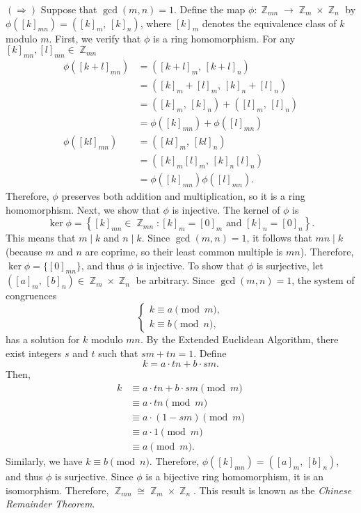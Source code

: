 \documentclass{article}
\DeclareMathOperator{\Z}{\mathbb{Z}}
\begin{document}
\((\Rightarrow)\) Suppose that $\gcd(m, n) = 1$. Define the map $\phi: \Z_{mn} \to \Z_m \times \Z_n$ by \(\phi([k]_{mn}) = \left([k]_m,\, [k]_n\right)\), where $[k]_m$ denotes the equivalence class of $k$ modulo $m$. First, we verify that $\phi$ is a ring homomorphism. For any $[k]_{mn}, [l]_{mn} \in \Z_{mn}$
\begin{align*}
\phi([k + l]_{mn}) &= \left([k + l]_m,\, [k + l]_n\right) \\
&= \left([k]_m + [l]_m,\, [k]_n + [l]_n\right) \\
&= \left([k]_m,\, [k]_n\right) + \left([l]_m,\, [l]_n\right) \\
&= \phi([k]_{mn}) + \phi([l]_{mn}) \\
\phi([kl]_{mn}) &= \left([kl]_m,\, [kl]_n\right) \\
&= \left([k]_m[l]_m,\, [k]_n[l]_n\right) \\
&= \phi([k]_{mn})\phi([l]_{mn}).
\end{align*}
Therefore, $\phi$ preserves both addition and multiplication, so it is a ring homomorphism. Next, we show that $\phi$ is injective. The kernel of $\phi$ is
\[\ker \phi = \left\{ [k]_{mn} \in \Z_{mn}: [k]_m = [0]_m \text{ and } [k]_n = [0]_n \right\}.\]
This means that $m \mid k$ and $n \mid k$. Since $\gcd(m, n) = 1$, it follows that $mn \mid k$ (because $m$ and $n$ are coprime, so their least common multiple is $mn$). Therefore, $\ker \phi = \{ [0]_{mn} \}$, and thus $\phi$ is injective. To show that $\phi$ is surjective, let $\left([a]_m,\, [b]_n\right) \in \Z_m \times \Z_n$ be arbitrary. Since $\gcd(m, n) = 1$, the system of congruences
\[
\begin{cases}
k \equiv a \pmod{m}, \\
k \equiv b \pmod{n},
\end{cases}
\]
has a solution for $k$ modulo $mn$. By the Extended Euclidean Algorithm, there exist integers $s$ and $t$ such that $s m + t n = 1$. Define
\[
k = a \cdot t n + b \cdot s m.
\]
Then,
\begin{align*}
k &\equiv a \cdot t n + b \cdot s m \pmod{m} \\
&\equiv a \cdot t n \pmod{m} \\
&\equiv a \cdot (1 - s m) \pmod{m} \\
&\equiv a \cdot 1 \pmod{m} \\
&\equiv a \pmod{m}.
\end{align*}
Similarly, we have $k \equiv b \pmod{n}$. Therefore, $\phi([k]_{mn}) = \left([a]_m,\, [b]_n\right)$, and thus $\phi$ is surjective. Since $\phi$ is a bijective ring homomorphism, it is an isomorphism. Therefore, $\Z_{mn} \cong \Z_m \times \Z_n$. This result is known as the \textit{Chinese Remainder Theorem}.
\end{document}
